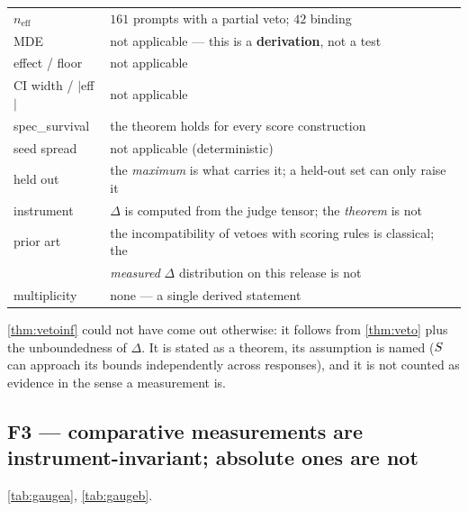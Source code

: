 \begin{table}[H]\centering\footnotesize
\begin{tabular}{ll}
\toprule
$n_{\text{eff}}$ & $161$ prompts with a partial veto; $42$ binding\\
MDE & not applicable --- this is a \textbf{derivation}, not a test\\
effect / floor & not applicable\\
CI width / $|$eff$|$ & not applicable\\
spec\_survival & the theorem holds for every score construction\\
seed spread & not applicable (deterministic)\\
held out & the \emph{maximum} is what carries it; a held-out set can only raise it\\
instrument & $\Delta$ is computed from the judge tensor; the \emph{theorem} is not\\
prior art & the incompatibility of vetoes with scoring rules is classical; the\\
 & \emph{measured} $\Delta$ distribution on this release is not\\
multiplicity & none --- a single derived statement\\
\bottomrule
\end{tabular}
\end{table}

\begin{remark}
\cref{thm:vetoinf} could not have come out otherwise: it follows from
\cref{thm:veto} plus the unboundedness of $\Delta$. It is stated as a theorem,
its assumption is named ($S$ can approach its bounds independently across
responses), and it is not counted as evidence in the sense a measurement is.
\end{remark}

\subsection{F3 --- comparative measurements are instrument-invariant; absolute ones are not}

\cref{tab:gaugea}, \cref{tab:gaugeb}.

